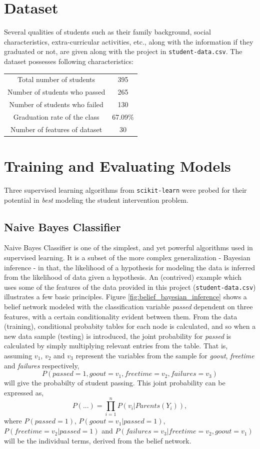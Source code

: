 \documentclass{article}
\begin{document}
	\section{Dataset}
	Several qualities of students such as their family background, social characteristics, extra-curricular activities, etc., along with the information if they graduated or not, are given along with the project in \texttt{student-data.csv}. The dataset possesses following characteristics:
	\begin{center}
		\begin{tabular}{c|c}
			\toprule
			Total number of students & 395 \\
			Number of students who passed & 265 \\
			Number of students who failed & 130  \\
			Graduation rate of the class & 67.09\% \\
			Number of features of dataset & 30 \\
			\bottomrule
		\end{tabular}
		\label{tab:data_characteristics}
	\end{center}
	
	\section{Training and Evaluating Models}
	Three supervised learning algorithms from \texttt{scikit-learn} were probed for their potential in \emph{best} modeling the student intervention problem. 
	\subsection{Naive Bayes Classifier}
	Naive Bayes Classifier is one of the simplest, and yet powerful algorithms used in supervised learning. It is a subset of the more complex generalization - Bayesian inference - in that, the likelihood of a hypothesis for modeling the data is inferred from the likelihood of data given a hypothesis. An (contrived) example which uses some of the features of the data provided in this project (\texttt{student-data.csv}) illustrates a few basic principles. Figure \ref{fig:belief_bayesian_inference} shows a belief network modeled with the classification variable \emph{passed} dependent on three features, with a certain conditionality evident between them. From the data (training), conditional probabity tables for each node is calculated, and so when a new data sample (testing) is introduced, the joint probability for \emph{passed} is calculated by simply multiplying relevant entries from the table. That is, assuming $v_1$, $v_2$ and $v_3$ represent the variables from the sample for \emph{goout}, \emph{freetime} and \emph{failures} respectively, 
	\[P(passed=1, goout=v_1, freetime=v_2, failures=v_3)\] will give the probabilty of student passing. This joint probability can be expressed as, \[P(...) = \prod_{i=1}^{n}P(v_i|Parents(Y_i)),\] where $P(passed=1)$, $P(goout=v_1|passed=1)$, $P(freetime=v_2|passed=1)$ and $P(failures=v_3|freetime=v_2,goout=v_1)$ will be the individual terms, derived from the belief network.
	
\end{document}
